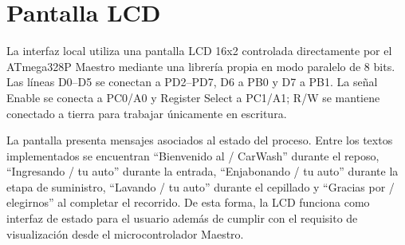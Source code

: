 \section{Pantalla LCD}

La interfaz local utiliza una pantalla LCD 16x2 controlada directamente por el ATmega328P Maestro mediante una librería propia en modo paralelo de 8 bits. Las líneas D0--D5 se conectan a PD2--PD7, D6 a PB0 y D7 a PB1. La señal Enable se conecta a PC0/A0 y Register Select a PC1/A1; R/W se mantiene conectado a tierra para trabajar únicamente en escritura.

La pantalla presenta mensajes asociados al estado del proceso. Entre los textos implementados se encuentran ``Bienvenido al / CarWash'' durante el reposo, ``Ingresando / tu auto'' durante la entrada, ``Enjabonando / tu auto'' durante la etapa de suministro, ``Lavando / tu auto'' durante el cepillado y ``Gracias por / elegirnos'' al completar el recorrido. De esta forma, la LCD funciona como interfaz de estado para el usuario además de cumplir con el requisito de visualización desde el microcontrolador Maestro.

